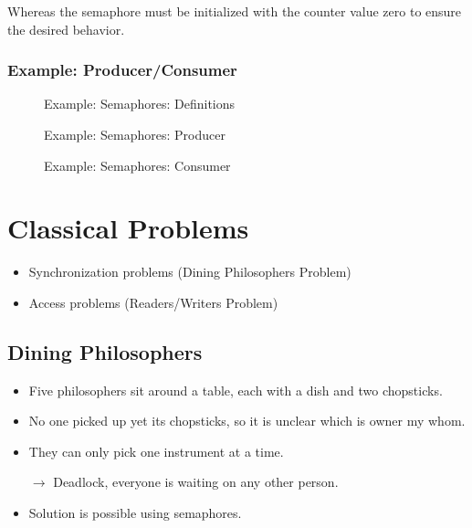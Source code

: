 \documentclass[a4paper, 11pt, accentcolor = tud3b]{tudreport}
\begin{document}
					Whereas the semaphore must be initialized with the counter value zero to ensure the desired behavior.

                \subsubsection{Example: Producer/Consumer}
                    \begin{figure}[H]
                    	\centering
                    	
						\caption{Example: Semaphores: Definitions}
					\end{figure}

					\begin{figure}[H]
						\centering
						
						\caption{Example: Semaphores: Producer}
					\end{figure}

					\begin{figure}[H]
						\centering
						
                    	\caption{Example: Semaphores: Consumer}
                    \end{figure}

        \section{Classical Problems}
            \begin{itemize}
            	\item Synchronization problems (Dining Philosophers Problem)
            	\item Access problems (Readers/Writers Problem)
            \end{itemize}

            \subsection{Dining Philosophers}
                \begin{itemize}
                	\item Five philosophers sit around a table, each with a dish and two chopsticks.
                	\item No one picked up yet its chopsticks, so it is unclear which is owner my whom.
                	\item They can only pick one instrument at a time.
                	\item[\(\rightarrow\)] Deadlock, everyone is waiting on any other person.
                	\item Solution is possible using semaphores.
                \end{itemize}
            
\end{document}

